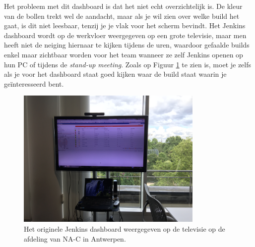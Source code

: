\documentclass[10pt,a4paper]{article}
\begin{document}
Het probleem met dit dashboard is dat het niet echt overzichtelijk is. De kleur van de bollen trekt wel de aandacht, maar als je wil zien over welke build het gaat, is dit niet leesbaar, tenzij je je vlak voor het scherm bevindt. Het Jenkins dashboard wordt op de werkvloer weergegeven op een grote televisie, maar men heeft niet de neiging hiernaar te kijken tijdens de uren, waardoor gefaalde builds enkel maar zichtbaar worden voor het team wanneer ze zelf Jenkins openen op hun PC of tijdens de \textit{stand-up meeting}. Zoals op Figuur \ref{tv_1} te zien is, moet je zelfs als je voor het dashboard staat goed kijken waar de build staat waarin je ge\"interesseerd bent.

\begin{figure}[ht!]
\centering
\includegraphics[width=90mm]{tvdashboardoriginal.jpg}
\caption{Het originele Jenkins dashboard weergegeven op de televisie op de afdeling van NA-C in Antwerpen.} 
\label{tv_1}
\end{figure}
\end{document}

